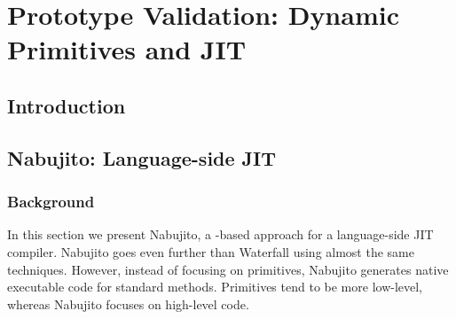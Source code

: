 

\chapter{Prototype Validation: Dynamic Primitives and JIT}
\minitoc


\section{Introduction}


\section{Nabujito: Language-side JIT}

\subsection{Background}
In this section we present Nabujito, a \B-based approach for a language-side JIT compiler.
Nabujito goes even further than Waterfall using almost the same techniques.
However, instead of focusing on primitives, Nabujito generates native executable code for standard \ST methods.
Primitives tend to be more low-level, whereas Nabujito focuses on high-level \ST code. 


